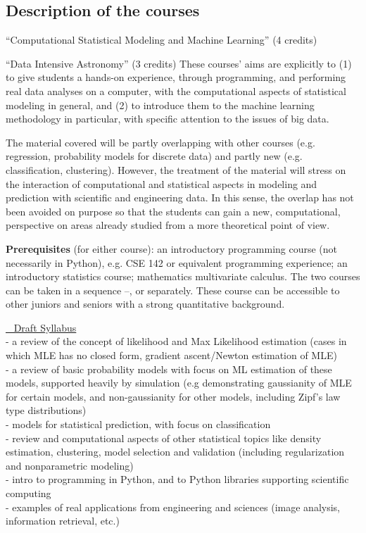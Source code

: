 \subsection{Description of the courses}
\label{sec:course-descr}

\bits
\item \statcl 
``Computational Statistical Modeling and Machine Learning'' (4 credits)
\item \astrocl ``Data Intensive Astronomy'' (3 credits)
\eits
These courses' aims are explicitly to (1) to give students a hands-on experience, through programming, and performing real data analyses on a computer, with the computational aspects of 
statistical modeling in general, and (2) to introduce them to the  machine learning methodology in particular, with specific attention to the issues of big data.

The material covered will be partly overlapping with other courses
(e.g. regression, probability models for discrete data) and partly new
(e.g. classification, clustering). However, the treatment of the
material will stress on the interaction of computational and
statistical aspects in modeling and prediction with scientific and
engineering data. In this sense, the overlap has not been avoided on purpose
so that the students can gain a new, computational, perspective on areas
already studied from a more theoretical point of view. 

{\bf Prerequisites} (for either course): an introductory programming
course (not necessarily in Python), e.g. CSE 142 or equivalent
programming experience; an introductory statistics course; mathematics
multivariate calculus. The two courses can be taken in a sequence
\statcl--\astrocl, or separately. These course can be accessible to
other juniors and seniors with a strong quantitative background.

\bit
\item  \underline{\statcl~ Draft Syllabus}\\
  - a review of the concept of likelihood and Max Likelihood estimation (cases in which MLE has no closed form, gradient ascent/Newton estimation of MLE)\\
  - a review of basic probability models with focus on ML estimation of these models, supported heavily by simulation (e.g demonstrating gaussianity of MLE for certain models, and non-gaussianity for other models, including Zipf's law type distributions)\\
  - models for statistical prediction, with focus on classification\\
  - review and computational aspects of other statistical topics like
  density estimation, clustering, model selection and validation
  (including regularization and  nonparametric modeling)\\
  - intro to programming in Python, and to Python libraries supporting scientific computing\\
  - examples of real applications from engineering and sciences (image
  analysis, information retrieval, etc.)

